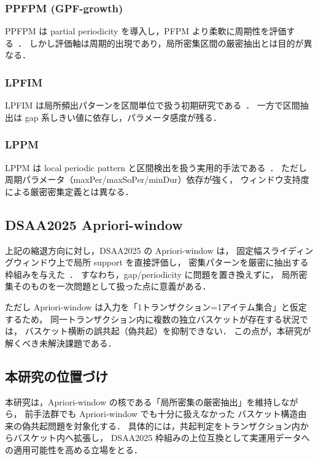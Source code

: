 \subsubsection{PPFPM (GPF-growth)}
PPFPM は partial periodicity を導入し，PFPM より柔軟に周期性を評価する~\cite{kiran2017discovering}．
しかし評価軸は周期的出現であり，局所密集区間の厳密抽出とは目的が異なる．

\subsubsection{LPFIM}
LPFIM は局所頻出パターンを区間単位で扱う初期研究である~\cite{mahanta2005finding}．
一方で区間抽出は gap 系しきい値に依存し，パラメータ感度が残る．

\subsubsection{LPPM}
LPPM は local periodic pattern と区間検出を扱う実用的手法である~\cite{fournier2021mining}．
ただし周期パラメータ（maxPer/maxSoPer/minDur）依存が強く，
ウィンドウ支持度による厳密密集定義とは異なる．

\subsection{DSAA2025 Apriori-window}
\label{sec:related_dsaa2025}

上記の縮退方向に対し，DSAA2025 の Apriori-window は，
固定幅スライディングウィンドウ上で局所 support を直接評価し，
密集パターンを厳密に抽出する枠組みを与えた~\cite{dsaa2025}．
すなわち，gap/periodicity に問題を置き換えずに，
局所密集そのものを一次問題として扱った点に意義がある．

ただし Apriori-window は入力を「1トランザクション=1アイテム集合」と仮定するため，
同一トランザクション内に複数の独立バスケットが存在する状況では，
バスケット横断の誤共起（偽共起）を抑制できない．
この点が，本研究が解くべき未解決課題である．

\subsection{本研究の位置づけ}
\label{sec:related_positioning}

本研究は，Apriori-window の核である「局所密集の厳密抽出」を維持しながら，
前手法群でも Apriori-window でも十分に扱えなかった
バスケット構造由来の偽共起問題を対象化する．
具体的には，共起判定をトランザクション内からバスケット内へ拡張し，
DSAA2025 枠組みの上位互換として実運用データへの適用可能性を高める立場をとる．

